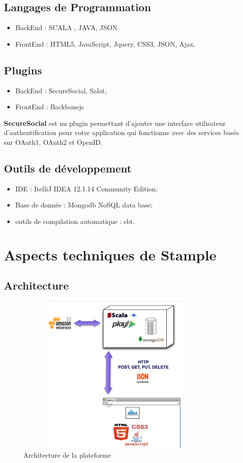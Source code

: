 \subsection{Langages de Programmation}
\begin{itemize}
\item BackEnd : SCALA , JAVA, JSON
\item FrontEnd : HTML5, JavaScript, Jquery, CSS3, JSON, Ajax. 
\end{itemize}
\subsection{Plugins}
\begin{itemize}
\item BackEnd : SecureSocial, Salat, 
\item FrontEnd : Backbonejs 
\end{itemize}
\textbf{SecureSocial} est un plugin permettant d'ajouter une interface utilisateur d'authentification pour votre application qui fonctionne avec des services basés sur OAuth1, OAuth2 et OpenID.
\subsection{Outils de développement}
\begin{itemize}
\item IDE : ItelliJ IDEA 12.1.14 Community Edition;
\item Base de donnée : Mongodb NoSQL data base;
\item outils de compilation automatique : sbt.
\end{itemize}
\section{Aspects techniques de Stample}
\subsection{Architecture}
\begin{figure}[H]
        \centering
                \centering
                \includegraphics[width=10cm,height=8cm]{architectureStample.png}
                \caption{Architecture de la plateforme}
                \label{fig:Architecture de la plateforme}
       
\end{figure}
